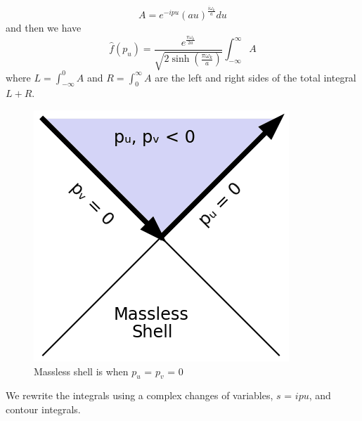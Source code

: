 \documentclass[12pt,a4paper]{article}
\begin{document}
\begin{equation}
  A = e^{-i p u} (au)^\frac{i\omega_k}{a} du
\end{equation}
and then we have
\begin{equation}
\label{finalnorm}
  \hat{f}(p_u) =  \frac{e^{\frac{\pi \omega_k}{2a}}}{\sqrt{2 \sinh \left({\frac{\pi\omega_k}{a}}\right)}}  \int_{-\infty}^\infty A
\end{equation}
where $L=\int_{-\infty}^0 A$ and $R=\int_0^\infty A$ are the left and right sides of the total integral $L + R$.

\begin{figure}[h]
\centering
\includegraphics[scale=0.5]{massless_shell.png}
\caption{Massless shell is when $p_u$ = $p_v$ = 0}
\label{masslessshell}
\end{figure}


We rewrite the integrals using a complex changes of variables, $s$ = $ipu$, and contour integrals.
\end{document}
